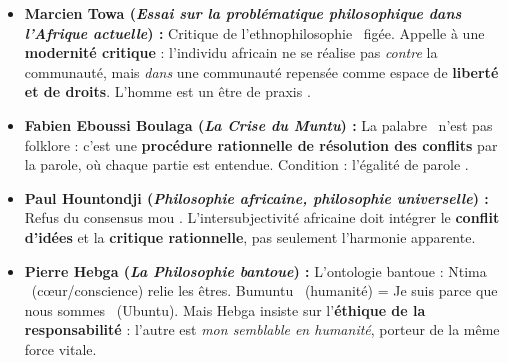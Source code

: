 \documentclass[11pt]{article}
\begin{document}
\begin{propriete}
\begin{itemize}
\item \textbf{Marcien Towa (\emph{Essai sur la problématique philosophique dans l'Afrique actuelle}) :} Critique de l'\guillemotleft ethnophilosophie \guillemotright\ figée. Appelle à une \textbf{modernité critique} : l'individu africain ne se réalise pas \emph{contre} la communauté, mais \emph{dans} une communauté repensée comme espace de \textbf{liberté et de droits}. \guillemotleft L'homme est un être de praxis \guillemotright.
\item \textbf{Fabien Eboussi Boulaga (\emph{La Crise du Muntu}) :} La \guillemotleft palabre \guillemotright\ n'est pas folklore : c'est une \textbf{procédure rationnelle de résolution des conflits} par la parole, où chaque partie est entendue. Condition : \guillemotleft l'égalité de parole \guillemotright.
\item \textbf{Paul Hountondji (\emph{Philosophie africaine, philosophie universelle}) :} Refus du \guillemotleft consensus mou \guillemotright. L'intersubjectivité africaine doit intégrer le \textbf{conflit d'idées} et la \textbf{critique rationnelle}, pas seulement l'harmonie apparente.
\item \textbf{Pierre Hebga (\emph{La Philosophie bantoue}) :} L'ontologie bantoue : \guillemotleft Ntima \guillemotright\ (cœur/conscience) relie les êtres. \guillemotleft Bumuntu \guillemotright\ (humanité) = \guillemotleft Je suis parce que nous sommes \guillemotright\ (Ubuntu). Mais Hebga insiste sur l'\textbf{éthique de la responsabilité} : l'autre est \emph{mon semblable en humanité}, porteur de la même force vitale.
\end{itemize}
\end{propriete}
\end{document}
